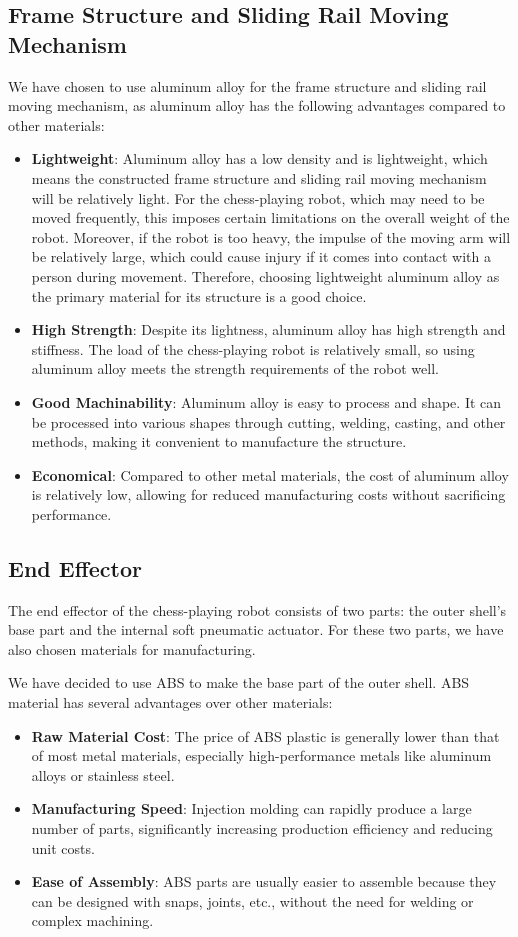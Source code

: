 \documentclass[10pt, a4paper, twocolumn]{article}
\begin{document}
\subsection{Frame Structure and Sliding Rail Moving Mechanism}
We have chosen to use aluminum alloy for the frame structure and sliding rail moving mechanism, as aluminum alloy has the following advantages compared to other materials:

\begin{itemize}
    \item \textbf{Lightweight}: Aluminum alloy has a low density and is lightweight, which means the constructed frame structure and sliding rail moving mechanism will be relatively light. For the chess-playing robot, which may need to be moved frequently, this imposes certain limitations on the overall weight of the robot. Moreover, if the robot is too heavy, the impulse of the moving arm will be relatively large, which could cause injury if it comes into contact with a person during movement. Therefore, choosing lightweight aluminum alloy as the primary material for its structure is a good choice.
    \item \textbf{High Strength}: Despite its lightness, aluminum alloy has high strength and stiffness. The load of the chess-playing robot is relatively small, so using aluminum alloy meets the strength requirements of the robot well.
    \item \textbf{Good Machinability}: Aluminum alloy is easy to process and shape. It can be processed into various shapes through cutting, welding, casting, and other methods, making it convenient to manufacture the structure.
    \item \textbf{Economical}: Compared to other metal materials, the cost of aluminum alloy is relatively low, allowing for reduced manufacturing costs without sacrificing performance.
\end{itemize}

\subsection{End Effector}
The end effector of the chess-playing robot consists of two parts: the outer shell's base part and the internal soft pneumatic actuator. For these two parts, we have also chosen materials for manufacturing.

We have decided to use ABS to make the base part of the outer shell. ABS material has several advantages over other materials:
\begin{itemize}
    \item \textbf{Raw Material Cost}: The price of ABS plastic is generally lower than that of most metal materials, especially high-performance metals like aluminum alloys or stainless steel.
    \item \textbf{Manufacturing Speed}: Injection molding can rapidly produce a large number of parts, significantly increasing production efficiency and reducing unit costs.
    \item \textbf{Ease of Assembly}: ABS parts are usually easier to assemble because they can be designed with snaps, joints, etc., without the need for welding or complex machining.
\end{itemize}
\end{document}
